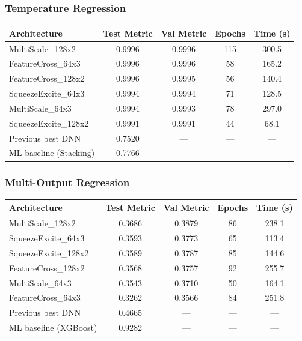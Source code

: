 \documentclass[11pt,a4paper]{article}
\begin{document}
\subsubsection*{Temperature Regression}

\begin{center}
\small
\begin{tabular}{lcccc}
\toprule
\textbf{Architecture} & \textbf{Test Metric} & \textbf{Val Metric} & \textbf{Epochs} & \textbf{Time (s)} \\
\midrule
MultiScale\_128x2 & 0.9996 & 0.9996 & 115 & 300.5 \\
FeatureCross\_64x3 & 0.9996 & 0.9996 & 58 & 165.2 \\
FeatureCross\_128x2 & 0.9996 & 0.9995 & 56 & 140.4 \\
SqueezeExcite\_64x3 & 0.9994 & 0.9994 & 71 & 128.5 \\
MultiScale\_64x3 & 0.9994 & 0.9993 & 78 & 297.0 \\
SqueezeExcite\_128x2 & 0.9991 & 0.9991 & 44 & 68.1 \\
\midrule
Previous best DNN & 0.7520 & --- & --- & --- \\
ML baseline (Stacking) & 0.7766 & --- & --- & --- \\
\bottomrule
\end{tabular}
\end{center}

\subsubsection*{Multi-Output Regression}

\begin{center}
\small
\begin{tabular}{lcccc}
\toprule
\textbf{Architecture} & \textbf{Test Metric} & \textbf{Val Metric} & \textbf{Epochs} & \textbf{Time (s)} \\
\midrule
MultiScale\_128x2 & 0.3686 & 0.3879 & 86 & 238.1 \\
SqueezeExcite\_64x3 & 0.3593 & 0.3773 & 65 & 113.4 \\
SqueezeExcite\_128x2 & 0.3589 & 0.3787 & 85 & 144.6 \\
FeatureCross\_128x2 & 0.3568 & 0.3757 & 92 & 255.7 \\
MultiScale\_64x3 & 0.3543 & 0.3710 & 50 & 164.1 \\
FeatureCross\_64x3 & 0.3262 & 0.3566 & 84 & 251.8 \\
\midrule
Previous best DNN & 0.4665 & --- & --- & --- \\
ML baseline (XGBoost) & 0.9282 & --- & --- & --- \\
\bottomrule
\end{tabular}
\end{center}
\end{document}
